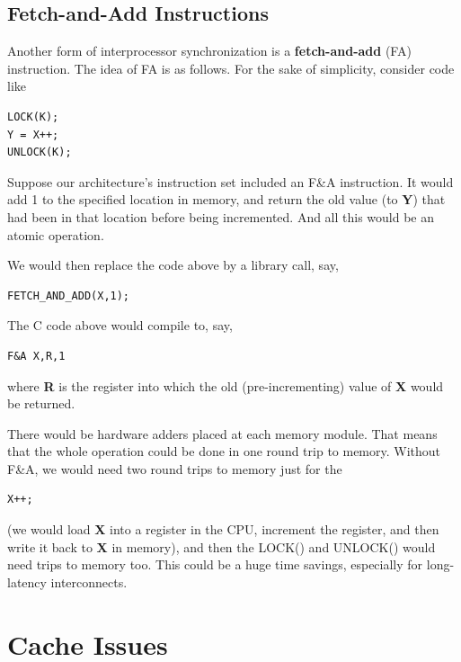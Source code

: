 \subsection{Fetch-and-Add Instructions}
\label{fanda}

Another form of interprocessor synchronization is a
\textbf{fetch-and-add} (FA) instruction.  The idea of FA is as follows.
For the sake of simplicity, consider code like

\begin{Verbatim}[fontsize=\relsize{-2}]
LOCK(K);
Y = X++;
UNLOCK(K);
\end{Verbatim}

Suppose our architecture's instruction set included an F\&A instruction.
It would add 1 to the specified location in memory, and return the old
value (to {\bf Y}) that had been in that location before being incremented.
And all this would be an atomic operation.

We would then replace the code above by a library call, say,

\begin{Verbatim}[fontsize=\relsize{-2}]
FETCH_AND_ADD(X,1);
\end{Verbatim}

The C code above would compile to, say,

\begin{Verbatim}[fontsize=\relsize{-2}]
F&A X,R,1
\end{Verbatim}

where {\bf R} is the register into which the old (pre-incrementing)
value of {\bf X} would be returned.

There would be hardware adders placed at each memory module. That means
that the whole operation could be done in one round trip to memory.
Without F\&A, we would need two round trips to memory just for the

\begin{Verbatim}[fontsize=\relsize{-2}]
X++;
\end{Verbatim}

(we would load {\bf X} into a register in the CPU, increment the register, and
then write it back to {\bf X} in memory), and then the LOCK() and UNLOCK()
would need trips to memory too.  This could be a huge time savings,
especially for long-latency interconnects.

\section{Cache Issues}
\label{cacheissues}


